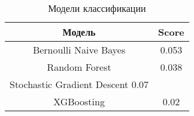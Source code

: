 
\begin{table}[H]
  \centering
  \begin{tabular} { | c | c | }
    \hline
    Модель & Score \\
    \hline
    Bernoulli Naive Bayes & 0.053 \\
    Random Forest & 0.038 \\
    Stochastic Gradient Descent 0.07 & \\
    XGBoosting & 0.02 \\
    \hline
  \end{tabular}
  \caption{Модели классификации}
\end{table}
